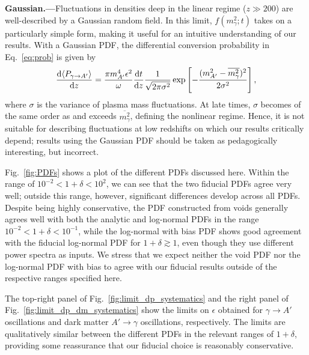 \documentclass[prd,aps,10pt,nofootinbib,twocolumn,superscriptaddress,preprintnumbers,balancelastpage,longbibliography]{revtex4-1}
\begin{document}
\noindent
{\bf Gaussian.---}Fluctuations in densities deep in the linear regime ($z \gg 200$) are well-described by a Gaussian random field. In this limit, $f(m_\gamma^2;t)$ takes on a particularly simple form, making it useful for an intuitive understanding of our results. With a Gaussian PDF, the differential conversion probability in Eq.~\eqref{eq:prob} is given by~\cite{OurLongPaper}
% 
\begin{alignat}{1}
    \frac{\mathrm{d} \langle P_{\gamma \to A'} \rangle}{\mathrm{d} z} = \frac{\pi m_{A^\prime}^4 \epsilon^2}{\omega} \frac{\mathrm{d} t}{\mathrm{d} z} \frac{1}{\sqrt{2\pi \sigma^2}} \exp \left[- \frac{( m_{A^\prime}^2 - \overline{m_\gamma^2} )^2}{2 \sigma^2}\right],
    \label{eq:dP_dz}
\end{alignat}    
%
where $\sigma$ is the variance of plasma mass fluctuations. At late times, $\sigma$ becomes of the same order as and exceeds $\overline{m_\gamma^2}$, defining the nonlinear regime. Hence, it is not suitable for describing fluctuations at low redshifts on which our results critically depend; results using the Gaussian PDF should be taken as pedagogically interesting, but incorrect.
\bigskip

Fig.~\ref{fig:PDFs} shows a plot of the different PDFs discussed here. Within the range of $10^{-2} < 1 + \delta < 10^2$, we can see that the two fiducial PDFs agree very well; outside this range, however, significant differences develop across all PDFs. Despite being highly conservative, the PDF constructed from voids generally agrees well with both the analytic and log-normal PDFs in the range $10^{-2} < 1 + \delta < 10^{-1}$, while the log-normal with bias PDF shows good agreement with the fiducial log-normal PDF for $1 + \delta \gtrsim 1$, even though they use different power spectra as inputs. We stress that we expect neither the void PDF nor the log-normal PDF with bias to agree with our fiducial results outside of the respective ranges specified here. 

The top-right panel of Fig.~\ref{fig:limit_dp_systematics} and the right panel of Fig.~\ref{fig:limit_dp_dm_systematics} show the limits on $\epsilon$ obtained for $\gamma \to A'$ oscillations and dark matter $A' \to \gamma$ oscillations, respectively. The limits are qualitatively similar between the different PDFs in the relevant ranges of $1+\delta$, providing some reassurance that our fiducial choice is reasonably conservative. 
\end{document}
